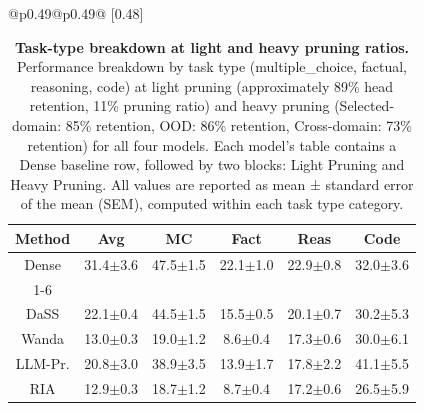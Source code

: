 \begin{table}[!t]
\caption{\textbf{Task-type breakdown at light and heavy pruning ratios.}
Performance breakdown by task type (multiple\_choice, factual, reasoning, code) at light pruning (approximately 89\% head retention, 11\% pruning ratio) and heavy pruning (Selected-domain: 85\% retention, OOD: 86\% retention, Cross-domain: 73\% retention) for all four models.
Each model's table contains a Dense baseline row, followed by two blocks: Light Pruning and Heavy Pruning.
All values are reported as mean ± standard error of the mean (SEM), computed within each task type category.}
\vspace{-2mm}
\footnotesize
\setlength{\tabcolsep}{2.8pt}
\renewcommand{\arraystretch}{1.05}
\begin{tabular}{@{}p{}@{}p{}@{}}
[0.48\textwidth]{
\begin{tabular}{c c c c c c}
\toprule
\textbf{Method} & \textbf{Avg} & \textbf{MC} & \textbf{Fact} & \textbf{Reas} & \textbf{Code} \\
\midrule
\rowcolor{white} Dense & 31.4{\scriptsize$\pm$3.6} & 47.5{\scriptsize$\pm$1.5} & 22.1{\scriptsize$\pm$1.0} & 22.9{\scriptsize$\pm$0.8} & 32.0{\scriptsize$\pm$3.6} \\
\cmidrule(lr){1-6}
\rowcolor{lightgray} \multicolumn{6}{c}{\rule{0pt}{2.2ex}\textbf{Light Pruning}\rule[-0.8ex]{0pt}{0pt}} \\
DaSS & 22.1{\scriptsize$\pm$0.4} & 44.5{\scriptsize$\pm$1.5} & 15.5{\scriptsize$\pm$0.5} & 20.1{\scriptsize$\pm$0.7} & 30.2{\scriptsize$\pm$5.3} \\
Wanda & 13.0{\scriptsize$\pm$0.3} & 19.0{\scriptsize$\pm$1.2} & 8.6{\scriptsize$\pm$0.4} & 17.3{\scriptsize$\pm$0.6} & 30.0{\scriptsize$\pm$6.1} \\
LLM-Pr. & 20.8{\scriptsize$\pm$3.0} & 38.9{\scriptsize$\pm$3.5} & 13.9{\scriptsize$\pm$1.7} & 17.8{\scriptsize$\pm$2.2} & 41.1{\scriptsize$\pm$5.5} \\
RIA & 12.9{\scriptsize$\pm$0.3} & 18.7{\scriptsize$\pm$1.2} & 8.7{\scriptsize$\pm$0.4} & 17.2{\scriptsize$\pm$0.6} & 26.5{\scriptsize$\pm$5.9} \\

\end{tabular}}
\end{tabular}
\end{table}
